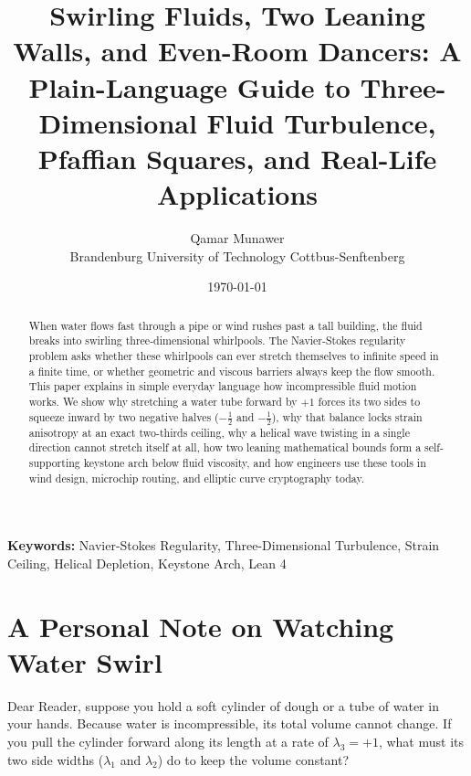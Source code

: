 \documentclass[11pt,a4paper]{article}
\title{\textbf{Swirling Fluids, Two Leaning Walls, and Even-Room Dancers: A Plain-Language Guide to Three-Dimensional Fluid Turbulence, Pfaffian Squares, and Real-Life Applications}}
\author{Qamar Munawer \\
Brandenburg University of Technology Cottbus-Senftenberg}
\date{\today}
\theoremstyle{definition}
\begin{document}
\maketitle

\begin{abstract}
When water flows fast through a pipe or wind rushes past a tall building, the fluid breaks into swirling three-dimensional whirlpools. The Navier-Stokes regularity problem asks whether these whirlpools can ever stretch themselves to infinite speed in a finite time, or whether geometric and viscous barriers always keep the flow smooth. This paper explains in simple everyday language how incompressible fluid motion works. We show why stretching a water tube forward by $+1$ forces its two sides to squeeze inward by two negative halves ($-\frac{1}{2}$ and $-\frac{1}{2}$), why that balance locks strain anisotropy at an exact two-thirds ceiling, why a helical wave twisting in a single direction cannot stretch itself at all, how two leaning mathematical bounds form a self-supporting keystone arch below fluid viscosity, and how engineers use these tools in wind design, microchip routing, and elliptic curve cryptography today.
\end{abstract}

\vspace{1em}
\noindent\textbf{Keywords:} Navier-Stokes Regularity, Three-Dimensional Turbulence, Strain Ceiling, Helical Depletion, Keystone Arch, Lean 4

\section{A Personal Note on Watching Water Swirl}
Dear Reader, suppose you hold a soft cylinder of dough or a tube of water in your hands. Because water is incompressible, its total volume cannot change. If you pull the cylinder forward along its length at a rate of $\lambda_3 = +1$, what must its two side widths ($\lambda_1$ and $\lambda_2$) do to keep the volume constant?
\end{document}
